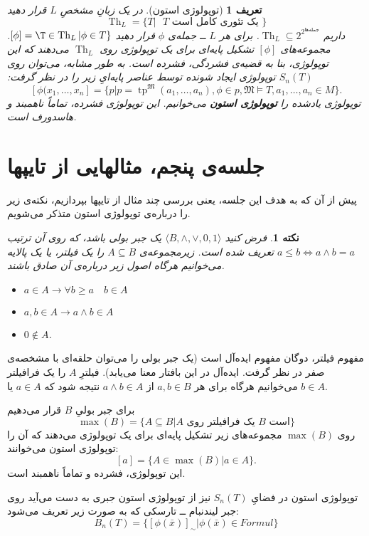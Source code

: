 \documentclass[12pt,a4paper]{article}
\theoremstyle{colorhead}
\newtheorem{defn}[thm]{تعریف}
\newtheorem{nokte}[thm]{نکته}
\DeclareMathOperator{\Th}{Th}
\DeclareMathOperator{\tp}{tp}
\begin{document}
\begin{defn}[توپولوژی استون]
در یک زبانِ مشخصِ
$L$
قرار دهید
\[
\Th_L=\{T|\text{ $T$ یک تئوری کامل است }\}
\]
داریم
$\Th_L\subseteq 2^{2^{\text{جمله‌ها}}}$.
برای هر 
$L$
ــ
جمله‌ی
$\phi$
قرار دهید
$[\phi]=\T\in \Th_L|\phi\in T\}$.
مجموعه‌های
$[\phi]$
تشکیل پایه‌ای برای یک توپولوژی روی
$\Th_L$
می‌دهند که این توپولوژی، بنا به قضیه‌ی فشردگی، فشرده است. به طور مشابه، می‌توان روی
 $S_n(T)$
 توپولوژی ایجاد شونده توسط عناصر پایه‌ایِ زیر را در نظر گرفت:
\[ 
 [\phi(x_1,\ldots,x_n]=\{p|
p=\tp^\mathfrak{M}(a_1,\ldots,a_n),
 \phi\in 
p,\mathfrak{M}\models T,a_1,\ldots,a_n\in M\}.
\]
توپولوژی یادشده را \textbf{توپولوژی استون} می‌خوانیم. این توپولوژی فشرده، تماماً ناهمبند و هاسدورف است.
\end{defn}
\pagebreak
\section{جلسه‌ی پنجم، مثالهایی از تایپها}
پیش از آن که به هدف این جلسه، یعنی 
بررسی چند مثال از تایپها بپردازیم، نکته‌ی زیر را درباره‌ی توپولوژی استون متذکر می‌شویم.
\begin{nokte}
فرض کنید
$\langle B,\wedge,\vee, 0,1\rangle$
یک جبر بولی باشد، که روی آن ترتیب 
$a\leq b\Leftrightarrow a\wedge b=a$
تعریف شده است. زیرمجموعه‌ی
$A\subseteq B$
را یک فیلتر، یا یک پالایه می‌خوانیم هرگاه
اصول زیر درباره‌ی آن صادق باشند.
\begin{itemize}
\item 
$a\in A\to \forall b\geq a \quad b\in A$
\item $a,b\in A\to a\wedge b\in A$
\item $0\not\in A$.
\end{itemize}
\end{nokte}
مفهوم
فیلتر،‌ دوگان مفهوم ایده‌آل است (یک جبر بولی را می‌توان حلقه‌ای با مشخصه‌ی صفر در نظر گرفت. ایده‌آل در این بافتار معنا می‌یابد). فیلترِ
$A$
را یک فرافیلتر می‌خوانیم هرگاه برای هر
$a,b\in B$
از
$a\wedge b\in A$
نتیجه شود که
$a\in A$
یا
$b\in A$.
\par 
برای جبر بولیِ
$B$
قرار می‌دهیم
\[
\max({B})=\{A\subseteq B| \text{$A$ یک فرافیلتر روی $B$ است}\}
\]
روی
$\max({B})$
مجموعه‌های زیر تشکیل پایه‌ای برای یک توپولوژی می‌دهند که آن را توپولوژی استون می‌خوانند:
\[
[a]=\{A\in \max(B)|a\in A\}.
\]
این توپولوژی، فشرده و تماماً ناهمبند است. 
\par 
توپولوژی استون در فضایِ
$S_n(T)$
نیز از توپولوژی استون جبری به دست می‌آید  روی جبر
لیندنبام ــ تارسکی  که به صورت زیر تعریف می‌شود:
\[
B_n(T)=\{[\phi(\bar{x})]_\sim| \phi(\bar{x})\in Formul\}
\]
\end{document}

